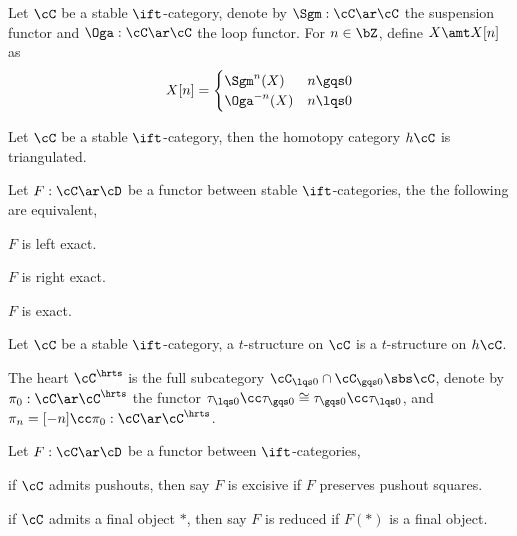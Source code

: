 \documentclass[a4paper, twoside]{article}
\begin{document}
\begin{dfn}[1.1.2.7]
    Let $\cC$ be a stable $\ift$-category, denote by $\Sgm:\cC\ar\cC$ the suspension functor and $\Oga:\cC\ar\cC$ the loop functor. For $n\in\bZ$, define $X\amt X[n]$ as
        \[
            X[n]=\begin{cases}
              \Sgm^{n}(X) & n\gqs0 \\
              \Oga^{-n}(X) & n\lqs0
            \end{cases}
        \]
\end{dfn}

\begin{thm}[1.1.2.14]

    Let $\cC$ be a stable $\ift$-category, then the homotopy category $h\cC$ is triangulated.

\end{thm}

\begin{thm}[1.1.4.1]
    Let $F:\cC\ar\cD$ be a functor between stable $\ift$-categories, the the following are equivalent,
    \begin{enr}[label=(\arabic*)]
        \item $F$ is left exact.
        \item $F$ is right exact.
        \item $F$ is exact.
    \end{enr}
\end{thm}



\begin{dfn}[1.2.1.4, 1.2.1.11]
    Let $\cC$ be a stable $\ift$-category, a $t$-structure on $\cC$ is a $t$-structure on $h\cC$.

    The heart $\cC^{\hrts}$ is the full subcategory $\cC_{\lqs0}\cap\cC_{\gqs0}\sbs\cC$, denote by $\pi_{0}:\cC\ar\cC^{\hrts}$ the functor $\tau_{\lqs0}\cc\tau_{\gqs0}\cong\tau_{\gqs0}\cc\tau_{\lqs0}$, and $\pi_{n}=[-n]\cc\pi_{0}:\cC\ar\cC^{\hrts}$.
\end{dfn}




\begin{dfn}[1.4.2.1]
    Let $F:\cC\ar\cD$ be a functor between $\ift$-categories,
    \begin{enr}[label=(\arabic*)]
        \item if $\cC$ admits pushouts, then say $F$ is excisive if $F$ preserves pushout squares.
        \item if $\cC$ admits a final object $*$, then say $F$ is reduced if $F(*)$ is a final object.
    \end{enr}
\end{dfn}
\end{document}
